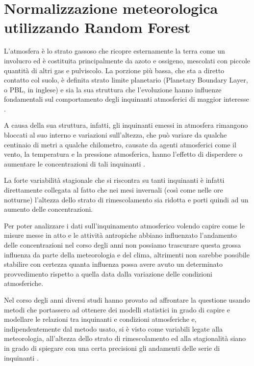 \documentclass[a4paper]{report}
\begin{document}
\chapter{Normalizzazione meteorologica utilizzando Random Forest}
L'atmosfera è lo strato gassoso che ricopre esternamente la terra come un involucro ed è costituita principalmente da azoto e ossigeno, mescolati con piccole quantità di altri gas e pulviscolo. La porzione più bassa, che sta a diretto contatto col suolo, è definita strato limite planetario (Planetary Boundary Layer, o PBL, in inglese) e sia la sua struttura che l'evoluzione hanno influenze fondamentali sul comportamento degli inquinanti atmosferici di maggior interesse \cite{dina2009concentrazione}.  

A causa della sua struttura, infatti, gli inquinanti emessi in atmosfera rimangono bloccati al suo interno e variazioni sull'altezza, che può variare da qualche centinaio di metri a qualche chilometro, causate da agenti atmosferici come il vento, la temperatura e la pressione atmosferica, hanno l'effetto di disperdere o aumentare le concentrazioni di tali inquinanti \cite{stull2012introduction}.  

La forte variabilità stagionale che si riscontra su tanti inquinanti è infatti direttamente collegata al fatto che nei mesi invernali (così come nelle ore notturne) l'altezza dello strato di rimescolamento sia ridotta e porti quindi ad un aumento delle concentrazioni.  

Per poter analizzare i dati sull'inquinamento atmosferico volendo capire come le misure messe in atto e le attività antropiche abbiano influenzato l'andamento delle concentrazioni nel corso degli anni non possiamo trascurare questa grossa influenza da parte della meteorologia e del clima, altrimenti non sarebbe possibile stabilire con certezza quanta influenza possa avere avuto un determinato provvedimento rispetto a quella data dalla variazione delle condizioni atmosferiche.  

Nel corso degli anni diversi studi hanno provato ad affrontare la questione usando metodi che portassero ad ottenere dei modelli statistici in grado di capire e modellare le relazioni tra inquinanti e condizioni atmosferiche e, indipendentemente dal metodo usato, si è visto come variabili legate alla meteorologia, all'altezza dello strato di rimescolamento ed alla stagionalità siano in grado di spiegare con una certa precisioni gli andamenti delle serie di inquinanti \cite{aldrin2005generalised, elminir2005depndence, eagleman1991air, seagal1982numerical, cattani2014analisi, barmpadimos2011influence}.  
\end{document}
